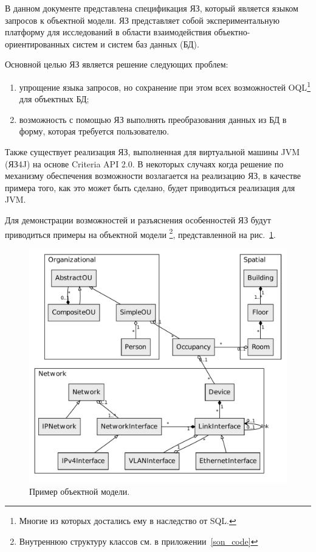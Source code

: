 В данном документе представлена спецификация ЯЗ, который 
является языком запросов к объектной модели. %
ЯЗ представляет собой экспериментальную платформу для исследований в области
взаимодействия объектно-ориентированных систем и систем баз данных (БД).

Основной целью ЯЗ является решение следующих проблем:
\begin{enumerate}
    \item упрощение языка запросов, но сохранение при этом всех возможностей
    OQL\footnote{Многие из которых достались ему в наследство от SQL.} для объектных БД;
    \item возможность с помощью ЯЗ выполнять преобразования
данных из БД в форму, которая требуется пользователю.
\end{enumerate}

Также существует реализация ЯЗ, выполненная  
для виртуальной машины JVM (ЯЗ4J) на основе Criteria API 2.0. %
В некоторых случаях когда решение по
механизму обеспечения возможности возлагается на реализацию ЯЗ, 
в качестве примера того, как это может быть сделано, будет приводиться реализация для JVM.

Для демонстрации возможностей и разъяснения особенностей ЯЗ будут приводиться
примеры на объектной модели
\footnote{Внутреннюю структуру классов см. в приложении~\ref{son_code}}, представленной на рис.~\ref{fig:son-model}.

\begin{figure}[hbt]
  \centering
  \includegraphics[scale=0.7]{figures/son}
  \caption{Пример объектной модели.}%
  \label{fig:son-model}
\end{figure}

